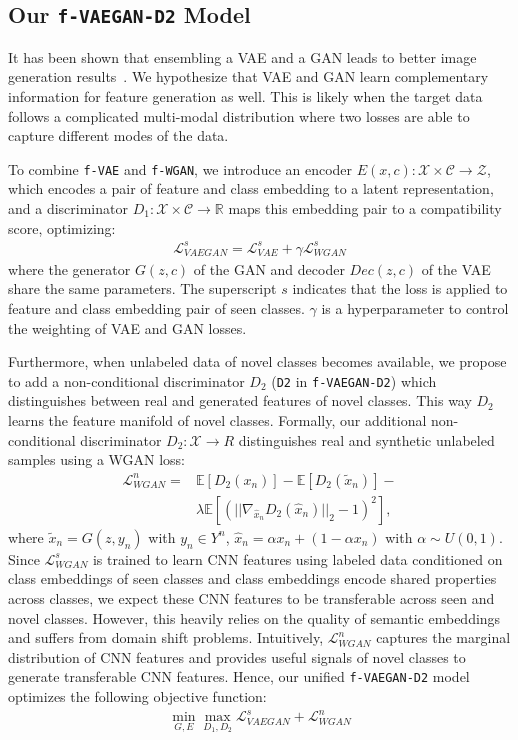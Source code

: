 \documentclass[10pt,twocolumn,letterpaper]{article}
\begin{document}
\subsection{Our \textbf{\texttt{f-VAEGAN-D2}} Model}
It has been shown that ensembling a VAE and a GAN leads to better image generation results~\cite{larsen2015autoencoding}. We hypothesize that VAE and GAN learn complementary information for feature generation as well. This is likely when the target data follows a complicated multi-modal distribution where two losses are able to capture different modes of the data.

To combine \texttt{f-VAE} and \texttt{f-WGAN}, we introduce an encoder $E(x,c): \mathcal{X} \times \mathcal{C}\rightarrow \mathcal{Z}$, which encodes a pair of feature and class embedding to a latent representation, and a discriminator $D_1: \mathcal{X} \times \mathcal{C} \rightarrow \mathbb{R}$ maps this embedding pair to a compatibility score, optimizing: 
\begin{align}
\label{eq:tran}
\mathcal{L}^s_{VAEGAN} = \mathcal{L}^s_{VAE} + \gamma \mathcal{L}^s_{WGAN}
\end{align}
where the generator $G(z, c)$ of the GAN and decoder $Dec(z, c)$ of the VAE share the same parameters.  
The superscript $s$ indicates that the loss is applied to feature and class embedding pair of seen classes. $\gamma$ is a hyperparameter to  control the weighting of VAE and GAN losses. 


Furthermore, when unlabeled data of novel classes becomes available, we propose to add a non-conditional discriminator $D_2$ (\texttt{D2} in \texttt{f-VAEGAN-D2}) which distinguishes between real and generated features of novel classes. This way $D_2$ learns the feature manifold of novel classes. 
Formally, our additional non-conditional discriminator $D_2: \mathcal{X} \rightarrow R$ distinguishes real and synthetic unlabeled samples using a WGAN loss:
\begin{align}
\label{eq:tran}
\mathcal{L}^n_{WGAN} =& \mathbb{E}[D_2(x_n)] - \mathbb{E}[D_2(\tilde{x}_n)] - \\ 
& \lambda \mathbb{E}[\left(||\nabla_{\hat{x}_n}D_2(\hat{x}_n)||_2 - 1\right)^2], \nonumber
\end{align}
where $\tilde{x}_n = G(z, y_n)$ with $y_n\in Y^n$, $\hat{x}_n = \alpha x_n +(1-\alpha x_n)$ with $\alpha \sim U(0,1)$. Since $\mathcal{L}^s_{WGAN}$ is trained to learn CNN features using labeled data conditioned on class embeddings of seen classes and class embeddings encode shared properties across classes, we expect these CNN features to be transferable across seen and novel classes. However, this heavily relies on the quality of semantic embeddings and suffers from domain shift problems. Intuitively, $\mathcal{L}^n_{WGAN}$  captures the marginal distribution of CNN features and provides useful signals of novel classes to generate transferable CNN features. Hence, our unified \texttt{f-VAEGAN-D2} model optimizes the following objective function: 
\begin{align}
\min_{G,E} \max_{D_1, D_2} \mathcal{L}^s_{VAEGAN} + \mathcal{L}^n_{WGAN}
\end{align}
\end{document}
